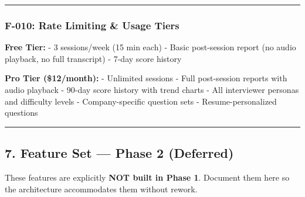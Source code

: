 \documentclass[
  11pt,
]{article}
\begin{document}
\begin{center}\rule{0.5\linewidth}{0.5pt}\end{center}

\hypertarget{f-010-rate-limiting-usage-tiers}{%
\subsubsection{F-010: Rate Limiting \& Usage
Tiers}\label{f-010-rate-limiting-usage-tiers}}

\textbf{Free Tier:} - 3 sessions/week (15 min each) - Basic post-session
report (no audio playback, no full transcript) - 7-day score history

\textbf{Pro Tier (\$12/month):} - Unlimited sessions - Full post-session
reports with audio playback - 90-day score history with trend charts -
All interviewer personas and difficulty levels - Company-specific
question sets - Resume-personalized questions

\begin{center}\rule{0.5\linewidth}{0.5pt}\end{center}

\hypertarget{feature-set-phase-2-deferred}{%
\subsection{7. Feature Set --- Phase 2
(Deferred)}\label{feature-set-phase-2-deferred}}

These features are explicitly \textbf{NOT built in Phase 1}. Document
them here so the architecture accommodates them without rework.
\end{document}
